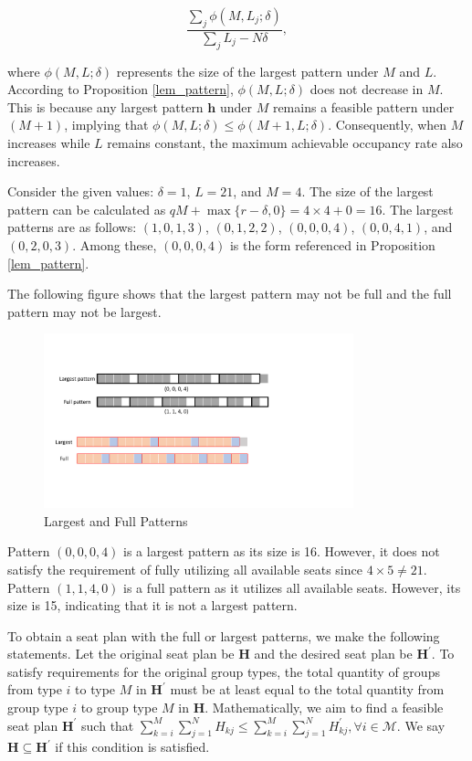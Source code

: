 $$\frac{\sum_{j}\phi(M, L_{j}; \delta)}{\sum_{j} L_{j}- N \delta},$$

where $\phi(M, L; \delta)$ represents the size of the largest pattern under $M$ and $L$. According to Proposition \ref{lem_pattern}, $\phi(M, L; \delta)$ does not decrease in $M$. This is because any largest pattern $\bm{h}$ under $M$ remains a feasible pattern under $(M+1)$, implying that $\phi(M, L;\delta) \leq \phi(M+1, L; \delta)$. Consequently, when $M$ increases while $L$ remains constant, the maximum achievable occupancy rate also increases.

\begin{example}
Consider the given values: $\delta = 1$, $L = 21$, and $M = 4$. The size of the largest pattern can be calculated as $qM + \max\{r-\delta, 0\} = 4 \times 4 + 0 = 16$. The largest patterns are as follows: $(1, 0, 1, 3)$, $(0, 1, 2, 2)$, $(0, 0, 0, 4)$, $(0, 0, 4, 1)$, and $(0, 2, 0, 3)$. Among these, $(0, 0, 0, 4)$ is the form referenced in Proposition \ref{lem_pattern}.

The following figure shows that the largest pattern may not be full and the full pattern may not be largest.
\begin{figure}[ht]
    \centering
        \includegraphics[width=0.8\textwidth]{./Figures/largest_full.pdf}
    \caption{Largest and Full Patterns}
\end{figure}

Pattern $(0, 0, 0, 4)$ is a largest pattern as its size is 16. However, it does not satisfy the requirement of fully utilizing all available seats since $4 \times 5 \neq 21$. Pattern $(1, 1, 4, 0)$ is a full pattern as it utilizes all available seats. However, its size is 15, indicating that it is not a largest pattern.
\end{example}

To obtain a seat plan with the full or largest patterns, we make the following statements.
Let the original seat plan be $\bm{H}$ and the desired seat plan be $\bm{H}^{\prime}$. To satisfy requirements for the original group types, the total quantity of groups from type $i$ to type $M$ in $\bm{H}^{\prime}$ must be at least equal to the total quantity from group type $i$ to group type $M$ in $\bm{H}$. Mathematically, we aim to find a feasible seat plan $\bm{H}^{\prime}$ such that $\sum_{k=i}^{M} \sum_{j=1}^{N} H_{kj} \leq \sum_{k=i}^{M} \sum_{j=1}^{N} H^{\prime}_{kj}, \forall i \in \mathcal{M}$. We say $\bm{H} \subseteq \bm{H}^{\prime}$ if this condition is satisfied.


